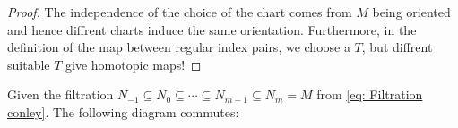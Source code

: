\begin{proof}
The independence of the choice of the chart comes from $M$ being oriented and hence diffrent charts induce the same orientation. Furthermore, in the definition of the map between regular index pairs, we choose a $T$, but diffrent suitable $T$ give homotopic maps! 

\end{proof}



\begin{theorem}
    Given the filtration $N_{-1}\subseteq N_0 \subseteq \cdots \subseteq N_{m-1} \subseteq N_m=M$   from \ref{eq: Filtration conley}.  The following diagram commutes:
    \begin{center}
    \end{center}
\end{theorem}
